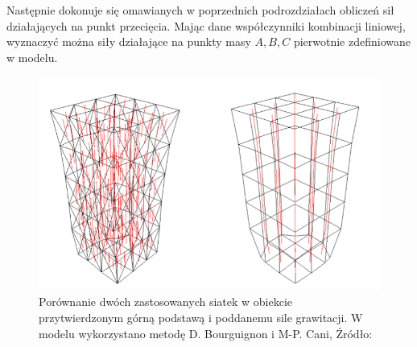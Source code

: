 Następnie dokonuje się omawianych w poprzednich podrozdziałach obliczeń sił działających na punkt przecięcia. Mając dane współczynniki kombinacji liniowej, wyznaczyć można siły działające na punkty masy $A,B,C$ pierwotnie zdefiniowane w modelu. 

\begin{figure}[ht]
\centering
\includegraphics[scale=0.5]{images/fixed_anisotropy.png}
\caption{Porównanie dwóch zastosowanych siatek w obiekcie przytwierdzonym górną podstawą i poddanemu sile grawitacji. W modelu wykorzystano metodę D. Bourguignon i M-P. Cani, Źródło: \cite{ca}}
\label{anizotropia-czworoscian-fix}
\end{figure}
